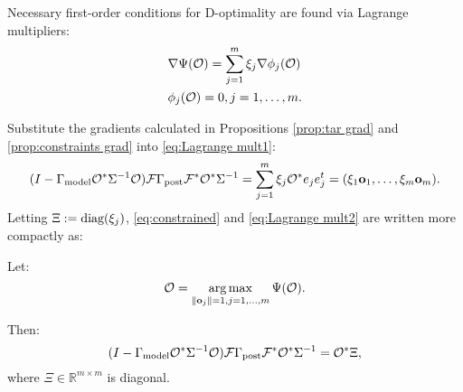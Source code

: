 



Necessary first-order conditions for D-optimality are found via
Lagrange multipliers:
\begin{align}
  &\nabla \Psi(\mathcal{O}) = \sum_{j=1}^m \xi_j \nabla \phi_j (\mathcal{O})
  \label{eq:Lagrange mult1} \\
    &\phi_j(\mathcal{O}) = 0, j = 1,\dots,m. \label{eq:Lagrange mult2}
\end{align}

Substitute the gradients calculated in Propositions \ref{prop:tar
  grad} and \ref{prop:constraints grad} into \eqref{eq:Lagrange
  mult1}:
\begin{equation}\label{eq:constrained}
  (I - \Gamma_{\textup{model}} \mathcal{O}^* \Sigma^{-1} \mathcal{O}) \mathcal{F} \Gamma_{\textup{post}} \mathcal{F}^* \mathcal{O}^*\Sigma^{-1}
  = \sum_{j=1}^m \xi_j \mathcal{O}^* e_je_j^t = (\xi_1 \mathbf{o}_1,\dots,\xi_m \mathbf{o}_m).
\end{equation} 
Letting $\Xi := \textup{diag}(\xi_j)$, \eqref{eq:constrained} and
\eqref{eq:Lagrange mult2} are written more compactly as:

\begin{theorem}\label{thm:constrained}
  Let:
  \begin{equation*}
    \mathcal{O} = \operatorname*{arg\,max}_{\|\mathbf{o}_j\| = 1, j=1,\dots,m}\Psi(\mathcal{O}).
  \end{equation*}
  
  Then:
  \begin{equation*}
    ( I - \Gamma_{\textup{model}} \mathcal{O}^* \Sigma^{-1} \mathcal{O}) \mathcal{F} \Gamma_{\textup{post}} \mathcal{F}^* \mathcal{O}^*  \Sigma^{-1}
    = \mathcal{O}^* \Xi, 
  \end{equation*}
  where $\Xi \in \mathbb{R}^{m \times m}$ is diagonal.
\end{theorem}




